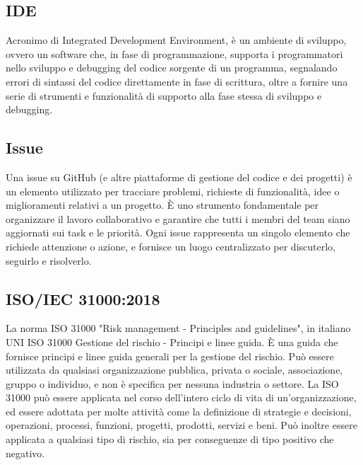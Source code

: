 \hypertarget{sec:ide}{}
\subsection*{IDE}
Acronimo di Integrated Development Environment, è un ambiente di sviluppo, ovvero un software che, in fase di programmazione, supporta i programmatori 
nello sviluppo e debugging del codice sorgente di un programma, segnalando errori di sintassi del codice direttamente in fase di scrittura, oltre a fornire 
una serie di strumenti e funzionalità di supporto alla fase stessa di sviluppo e debugging.

\subsection*{Issue}
Una issue su GitHub (e altre piattaforme di gestione del codice e dei progetti) è un elemento utilizzato per tracciare problemi, richieste di funzionalità, 
idee o miglioramenti relativi a un progetto. È uno strumento fondamentale per organizzare il lavoro collaborativo e garantire che tutti i membri del team 
siano aggiornati sui task e le priorità. Ogni issue rappresenta un singolo elemento che richiede attenzione o azione, e fornisce un luogo centralizzato per 
discuterlo, seguirlo e risolverlo.

\subsection*{ISO/IEC 31000:2018}
La norma ISO 31000 "Risk management - Principles and guidelines", 
in italiano UNI ISO 31000 Gestione del rischio - Principi e linee guida. 
È una guida che fornisce principi e linee guida generali per la gestione del rischio. 
Può essere utilizzata da qualsiasi organizzazione pubblica, privata o sociale, associazione, gruppo o individuo, e non è specifica per nessuna industria o settore.
La ISO 31000 può essere applicata nel corso dell'intero ciclo di vita di un'organizzazione, ed essere adottata per molte attività come la definizione di strategie e decisioni, operazioni, processi, funzioni, progetti, prodotti, servizi e beni.
Può inoltre essere applicata a qualsiasi tipo di rischio, sia per conseguenze di tipo positivo che negativo.


\newpage